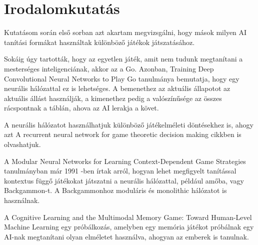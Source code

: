 \chapter{Irodalomkutatás}

\thispagestyle{fancy}
\pagestyle{fancy}

Kutatásom során első sorban azt akartam megvizsgálni, hogy mások milyen AI tanítási formákat használtak különböző játékok játszatásához. 

Sokáig úgy tartották, hogy az egyetlen játék, amit nem tudunk megtanítani a mesterséges inteligenciának, akkor az a Go. Azonban, Training Deep Convolutional Neural Networks to Play Go tanulmánya \cite{pmlr-v37-clark15} bemutatja,
 hogy egy neurális hálózattal ez is lehetséges. A bemenethez az aktuális állapotot az aktuális állást használják, a kimenethez pedig a valószínűsége az összes rácspontnak a táblán, ahova az AI lerakja a követ. 

 A neurális hálózatot használhatjuk különböző játékelméleti döntésekhez is, ahogy azt A recurrent neural network for game theoretic decision making \cite{bhatia2014recurrent} cikkben is olvashatjuk. 

A Modular Neural Networks for Learning Context-Dependent Game Strategies \cite{boyan1992modular} tanulmányban már 1991 -ben írtak arról, hogyan lehet megfigyelt tanítással kontextus függő játékokat játszatni a neurális hálózattal, például amőba, vagy Backgammon-t. A Backgammonhoz moduláris és monolithic hálózatot is használnak. 

A Cognitive Learning and the Multimodal Memory Game: Toward Human-Level Machine Learning \cite{4634261} egy próbálkozás, amelyben egy memória játékot próbálnak egy AI-nak megtanítani olyan elméletet használva, ahogyan az emberek is tanulnak.